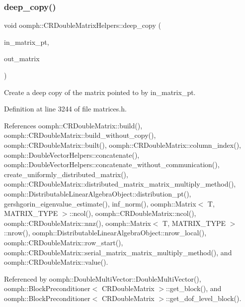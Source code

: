 \subsubsection{\texorpdfstring{deep\+\_\+copy()}{deep\_copy()}}
{\footnotesize\ttfamily void oomph\+::\+C\+R\+Double\+Matrix\+Helpers\+::deep\+\_\+copy (\begin{DoxyParamCaption}\item[{const \hyperlink{classoomph_1_1CRDoubleMatrix}{C\+R\+Double\+Matrix} $\ast$const}]{in\+\_\+matrix\+\_\+pt,  }\item[{\hyperlink{classoomph_1_1CRDoubleMatrix}{C\+R\+Double\+Matrix} \&}]{out\+\_\+matrix }\end{DoxyParamCaption})\hspace{0.3cm}{\ttfamily [inline]}}



Create a deep copy of the matrix pointed to by in\+\_\+matrix\+\_\+pt. 



Definition at line 3244 of file matrices.\+h.



References oomph\+::\+C\+R\+Double\+Matrix\+::build(), oomph\+::\+C\+R\+Double\+Matrix\+::build\+\_\+without\+\_\+copy(), oomph\+::\+C\+R\+Double\+Matrix\+::built(), oomph\+::\+C\+R\+Double\+Matrix\+::column\+\_\+index(), oomph\+::\+Double\+Vector\+Helpers\+::concatenate(), oomph\+::\+Double\+Vector\+Helpers\+::concatenate\+\_\+without\+\_\+communication(), create\+\_\+uniformly\+\_\+distributed\+\_\+matrix(), oomph\+::\+C\+R\+Double\+Matrix\+::distributed\+\_\+matrix\+\_\+matrix\+\_\+multiply\+\_\+method(), oomph\+::\+Distributable\+Linear\+Algebra\+Object\+::distribution\+\_\+pt(), gershgorin\+\_\+eigenvalue\+\_\+estimate(), inf\+\_\+norm(), oomph\+::\+Matrix$<$ T, M\+A\+T\+R\+I\+X\+\_\+\+T\+Y\+P\+E $>$\+::ncol(), oomph\+::\+C\+R\+Double\+Matrix\+::ncol(), oomph\+::\+C\+R\+Double\+Matrix\+::nnz(), oomph\+::\+Matrix$<$ T, M\+A\+T\+R\+I\+X\+\_\+\+T\+Y\+P\+E $>$\+::nrow(), oomph\+::\+Distributable\+Linear\+Algebra\+Object\+::nrow\+\_\+local(), oomph\+::\+C\+R\+Double\+Matrix\+::row\+\_\+start(), oomph\+::\+C\+R\+Double\+Matrix\+::serial\+\_\+matrix\+\_\+matrix\+\_\+multiply\+\_\+method(), and oomph\+::\+C\+R\+Double\+Matrix\+::value().



Referenced by oomph\+::\+Double\+Multi\+Vector\+::\+Double\+Multi\+Vector(), oomph\+::\+Block\+Preconditioner$<$ C\+R\+Double\+Matrix $>$\+::get\+\_\+block(), and oomph\+::\+Block\+Preconditioner$<$ C\+R\+Double\+Matrix $>$\+::get\+\_\+dof\+\_\+level\+\_\+block().

